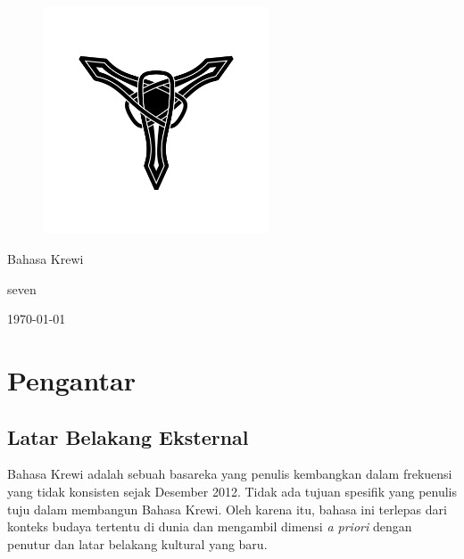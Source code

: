 \documentclass[12pt,oneside]{book}
\begin{document}
\frontmatter

\thispagestyle{empty}
\vspace*{\fill}

\begin{figure}[h]
	\centering
	\includegraphics[width=0.6\textwidth]{media/cover.jpg}
\end{figure}

\begin{center}
	{\huge Bahasa Krewi}

	{\large seven}

	\today
\end{center}
\clearpage

\pagestyle{fancy}
\tableofcontents
\listoffigures

\mainmatter
\chapter{Pengantar}
\section{Latar Belakang Eksternal}
Bahasa Krewi adalah sebuah basareka yang penulis kembangkan dalam frekuensi yang tidak konsisten sejak Desember 2012. Tidak ada tujuan spesifik yang penulis tuju dalam membangun Bahasa Krewi. Oleh karena itu, bahasa ini terlepas dari konteks budaya tertentu di dunia dan mengambil dimensi \emph{a priori} dengan penutur dan latar belakang kultural yang baru.
\end{document}
